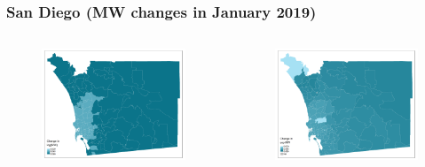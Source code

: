 \documentclass[aspectratio=169, t]{beamer}
\begin{document}
\begin{frame}[label = san_diego_example]
\frametitle{San Diego (MW changes in January 2019)}
    \begin{columns}
        \begin{column}{0.50\textwidth}
            \vspace{-4mm}
            \begin{figure}
                \centering
                \includegraphics[scale = 0.36]{maps_events/output/san_diego_2018-12_actual_mw.png}
            \end{figure}   
        \end{column}
        \begin{column}{0.50\textwidth}
            \vspace{-4mm}
            \begin{figure}
                \centering
                \includegraphics[scale = 0.36]{maps_events/output/san_diego2018-12_exp_mw.png}
            \end{figure}   
        \end{column}
    \end{columns}
     \hyperlink{chi_example}{}
\end{frame}
\end{document}
